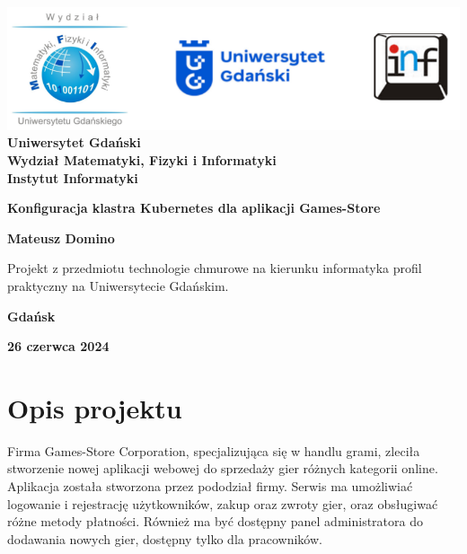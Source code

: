 \documentclass[12pt,a4paper]{article}
\newcommand{\hmwkTitle}{Konfiguracja klastra Kubernetes dla aplikacji Games-Store} %
\newcommand{\hmwkAuthorName}{Mateusz Domino} %
\begin{document}
\begin{titlepage}
    \vfill
	\begin{center}
	\hspace*{-1cm}
	\vspace*{0.5cm}
    \includegraphics[scale=0.55]{images/loga.png}\\
	\textbf{Uniwersytet Gdański \\ [0.05cm]Wydział Matematyki, Fizyki i Informatyki \\ [0.05cm] Instytut Informatyki}

	\vspace{0.6cm}
	\vspace{4cm}
	{\huge \textbf{\hmwkTitle}}\vspace{8mm}
	
	{\large \textbf{\hmwkAuthorName}}\\[3cm]
	
		\hspace{.45\textwidth} %
	   \begin{minipage}{.5\textwidth}
	   Projekt z przedmiotu technologie chmurowe na kierunku informatyka profil praktyczny na Uniwersytecie Gdańskim.\\[0.1cm]
	  \end{minipage}
	  \vfill
	
	\textbf{Gdańsk}

	\textbf{26 czerwca 2024}
	\end{center}
	
\end{titlepage}

\newpage
\setcounter{secnumdepth}{5}
\tableofcontents
\newpage

\section{Opis projektu}
\label{sec:Project}

Firma Games-Store Corporation, specjalizująca się w handlu grami, zleciła stworzenie nowej aplikacji webowej do sprzedaży gier różnych kategorii online. Aplikacja została stworzona przez pododział firmy. Serwis ma umożliwiać logowanie i rejestrację użytkowników, zakup oraz zwroty gier, oraz obsługiwać różne metody płatności. Również ma być dostępny panel administratora do dodawania nowych gier, dostępny tylko dla pracowników.
\end{document}
